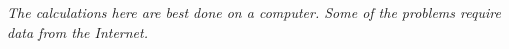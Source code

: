 \begin{exercises}
  \item[]\emph{The calculations here
      are best done on a computer.  
      Some of the problems require data 
      from the Internet.}

\end{exercises}

